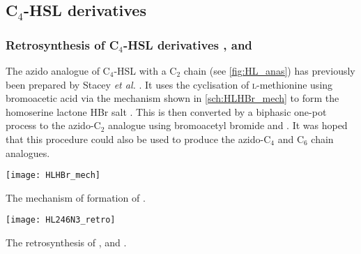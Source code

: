 \subsection{C$_4$-HSL derivatives}

\subsubsection{Retrosynthesis of C$_4$-HSL derivatives ,  and }

The azido analogue of C$_4$-HSL with a C$_2$ chain  (see \ref{fig:HL_anas}) has previously been prepared by Stacey \textit{et al.} \cite{Stacy2013}. It uses the cyclisation of \textsc{l}-methionine  using bromoacetic acid via the mechanism shown in \ref{sch:HLHBr_mech} to form the homoserine lactone HBr salt . This is then converted by a biphasic one-pot process to the azido-C$_2$ analogue  using bromoacetyl bromide  and . It was hoped that this procedure could also be used to produce the azido-C$_4$ and C$_6$ chain analogues.

\begin{scheme}[H]
	\begin{center}
		\texttt{[image: HLHBr\_mech]}
		\caption{The mechanism of formation of . \label{sch:HLHBr_mech}}
	\end{center}
\end{scheme}

\begin{scheme}[H]
	\begin{center}
		\texttt{[image: HL246N3\_retro]}
		\caption{The retrosynthesis of ,  and . \label{sch:HL246N3_retro}}
	\end{center}
\end{scheme}


